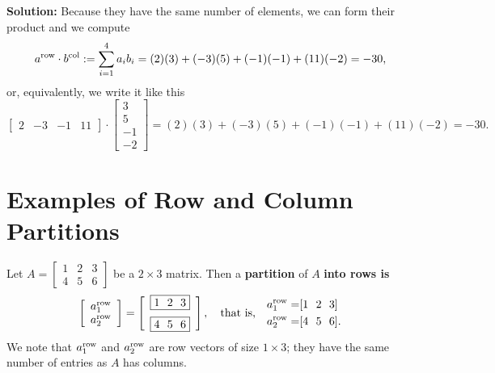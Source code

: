\textbf{Solution:}
Because they have the same number of elements, we can form their product and we compute 
$$a^{\rm row} \cdot b^{\rm col}:= \sum_{i=1}^4 a_i b_i = (2)(3) + (-3)(5) + (-1)(-1) + (11)(-2) = -30, $$
or, equivalently, we write it like this 
$$\begin{bmatrix} 2 & -3 & -1 & 11\end{bmatrix}\cdot  \left[\begin{array}{r}3 \\5 \\ -1 \\ -2 \end{array} \right] = (2)(3) + (-3)(5) + (-1)(-1) + (11)(-2) = -30. $$
\Qed  


\section{Examples of Row and Column Partitions}
Let $A=\left[\begin{array}{ccc} 1 & 2 & 3\\
4 & 5 & 6 \end{array}\right]$ be a $2\times 3$ matrix. Then a \textbf{partition} of $A$ \textbf{into rows is} 
$$\left[\begin{array}{c} a_1^{\rm row}\\
a_2^{\rm row} \end{array}\right]  = \left[\begin{array}{c}\boxed{ 1 ~~ 2 ~~ 3} \medskip \\
\boxed{4 ~~ 5 ~ ~6 }\end{array}\right],~~~\text{that is,}~~~\begin{aligned}
    a_1^{\rm row}= & [1 ~~ 2 ~~ 3] \medskip \\
    a_2^{\rm row}= & [4 ~~ 5 ~ ~6].
\end{aligned}$$
We note that $a_1^{\rm row}$ and $a_2^{\rm row}$ are row vectors of size $1 \times 3$; they have the same number of entries as $A$ has columns. \\

